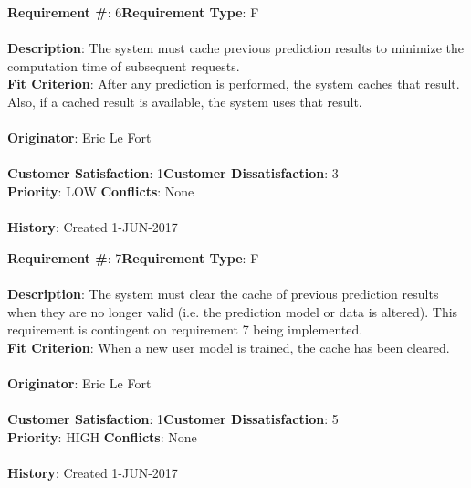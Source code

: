 \documentclass[titlepage]{article}
\begin{document}
\begin{framed}
	\noindent\textbf{Requirement \#}: 6\hfill \textbf{Requirement Type}: F\hfill\\\\
	\noindent\textbf{Description}: The system must cache previous prediction results to minimize the computation time of subsequent requests.\\
	\textbf{Fit Criterion}: After any prediction is performed, the system caches that result. Also, if a cached result is available, the system uses that result.\\\\
	\textbf{Originator}: Eric Le Fort\\\\
	\noindent\textbf{Customer Satisfaction}: 1\hfill \textbf{Customer Dissatisfaction}: 3\hfill\\
	\textbf{Priority}: LOW \hfill \textbf{Conflicts}: None\hfill\\\\
	\noindent\textbf{History}: Created 1-JUN-2017
\end{framed}
\newpage
\begin{framed}
	\noindent\textbf{Requirement \#}: 7\hfill \textbf{Requirement Type}: F\hfill\\\\
	\noindent\textbf{Description}: The system must clear the cache of previous prediction results when they are no longer valid (i.e. the prediction model or data is altered). This requirement is contingent on requirement 7 being implemented.\\
	\textbf{Fit Criterion}: When a new user model is trained, the cache has been cleared.\\\\
	\textbf{Originator}: Eric Le Fort\\\\
	\noindent\textbf{Customer Satisfaction}: 1\hfill \textbf{Customer Dissatisfaction}: 5\hfill\\
	\textbf{Priority}: HIGH \hfill \textbf{Conflicts}: None\hfill\\\\
	\noindent\textbf{History}: Created 1-JUN-2017
\end{framed}
\end{document}
